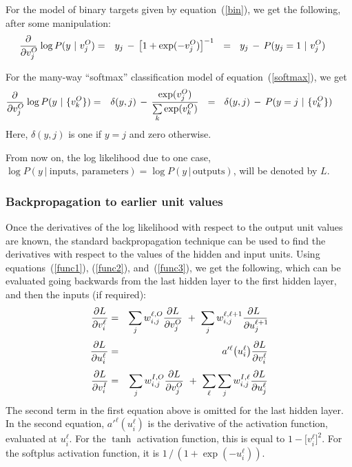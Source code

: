 \documentclass{report}[11pt]
\def\beq{\begin{eqnarray}}
\def\eeq{\end{eqnarray}}
\def\eep{\end{eqnarray}}
\begin{document}
For the model of binary targets given by equation~(\ref{bin}), we
get the following, after some manipulation:\beq
  {\partial \over \partial v^O_j\!}\, \log P(y\ |\ v^O_j) & = &
    y_j\, -\, \big[ 1 + \exp(-v^O_j) \big]^{-1}\ 
    \ =\ \ y_j \,-\, P(y_j=1\ |\ v^O_j)\ \ \ \
\label{bind}\eep

For the many-way ``softmax'' classification model of equation~(\ref{softmax}),
we get\beq
  {\partial \over \partial v^O_j\!}\, \log P(y\ |\ \{v^O_k\}) & = &
    \delta(y,j)\, -\, {\exp(v^O_j) \over \sum\limits_k \exp(v^O_k)}
    \ \ =\ \ \delta(y,j)\, -\, P(y=j\ |\ \{v^O_k\})\ \ \ \ \ \
\label{classd}\eeq%
Here, $\delta(y,j)$ is one if $y=j$ and zero otherwise.  

From now on, the log likelihood due to one case, $\log P(y\ |\
\mbox{inputs},\,\mbox{parameters}) = \log P(y\,|\,\mbox{outputs})$,
will be denoted by $L$.

\subsubsection*{Backpropagation to earlier unit values}

Once the derivatives of the log likelihood with respect to the output
unit values are known, the standard backpropagation technique can be
used to find the derivatives with respect to the values of the hidden
and input units.  Using equations~(\ref{func1}), (\ref{func2}),
and~(\ref{func3}), we get the following, which can be evaluated going
backwards from the last hidden layer to the first hidden layer, and
then the inputs (if required):\beq
  {\partial L \over \partial v^{\ell}_{i\ }\!} & = & 
    \sum_j w^{\ell,O}_{i,j} {\partial L \over \partial v^O_j} \ +\
    \sum_j w^{\ell,\ell+1}_{i,j} {\partial L\ \over \partial u^{\ell+1}_j\! }
    \\[3pt]
  {\partial L \over \partial u^{\ell}_{i\ }\!} & = & 
   a'^{\ell}\big(u^{\ell}_i\big) {\partial L \over \partial v^{\ell}_i } \\[3pt]
  {\partial L \over \partial v^I_{i\ }\!} & = & 
    \sum_j w^{I,O}_{i,j} {\partial L \over \partial v^O_j}\ +\
    \sum_{\ell} \sum_j w^{I,\ell}_{i,j} {\partial L \over \partial u^{\ell}_j }
\eeq%
The second term in the first equation above is omitted for the last
hidden layer.  In the second equation, $a'^{\ell}(u^{\ell}_i)$ is the derivative
of the activation function, evaluated at $u^{\ell}_i$.  For the $\tanh$
activation function, this is equal to $1 - \big[v^{\ell}_i\big]^2\!$.
For the softplus activation function, it is $1\,/\,(1+\exp(-u^{\ell}_i))$.
\end{document}
